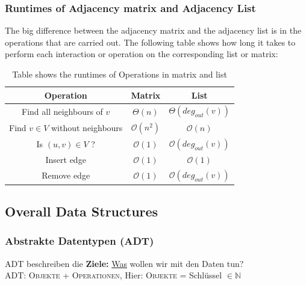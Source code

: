 \documentclass[a4paper]{article}
\begin{document}
\subsubsection{Runtimes of Adjacency matrix and Adjacency List}
The big difference between the adjacency matrix and the adjacency list is in the operations that are carried out. The following table shows how long it takes to perform each interaction or operation on the corresponding list or matrix:
   \begin{table}[h]
        \centering
        \begin{tabular}{c|c|c}
            \textbf{Operation}    & 
            \textbf{Matrix}    & 
            \textbf{List}    \\
     
            \hline
            Find all neighbours of $v$ &
            $\Theta(n)$ &
            $\Theta(deg_{out}(v))$ \\

            Find $v \in V$ without neighbours &
            $\mathcal{O}(n^2)$ &
            $\mathcal{O}(n)$ \\

            Is $(u,v) \in V$ ?&
            $\mathcal{O}(1)$ &
            $\mathcal{O}(deg_{out}(v))$ \\

            Insert edge &
            $\mathcal{O}(1)$ &
            $\mathcal{O}(1)$ \\

            Remove edge &
            $\mathcal{O}(1)$ &
            $\mathcal{O}(deg_{out}(v))$ \\

        \end{tabular}
        \caption{Table shows the runtimes of Operations in matrix and list}
        \label{tab:RuntimesMatrix and List}
    \end{table}

    \newpage
    
\subsection{Overall Data Structures}
\subsubsection*{Abstrakte Datentypen (ADT)}
ADT beschreiben die \textbf{Ziele:} \underline{Was} wollen wir mit den Daten tun? \\
ADT: \textsc{Objekte + Operationen}, Hier: \textsc{Objekte} = Schlüssel $\in \mathbb{N}$\\
\end{document}
